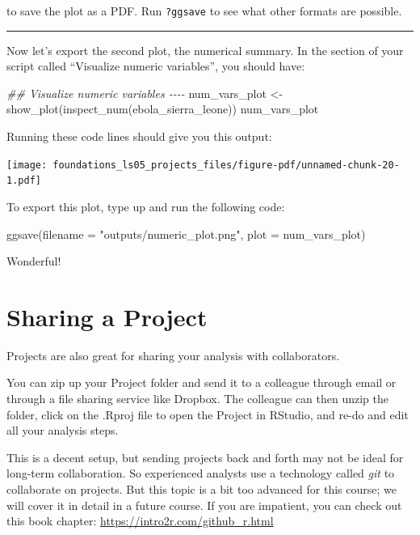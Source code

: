 \documentclass[
  letterpaper,
  DIV=11,
  numbers=noendperiod]{scrreprt}
\newenvironment{Shaded}{\begin{snugshade}}{\end{snugshade}}
\newcommand{\AttributeTok}[1]{\textcolor[rgb]{0.40,0.45,0.13}{#1}}
\newcommand{\DocumentationTok}[1]{\textcolor[rgb]{0.37,0.37,0.37}{\textit{#1}}}
\newcommand{\FunctionTok}[1]{\textcolor[rgb]{0.28,0.35,0.67}{#1}}
\newcommand{\NormalTok}[1]{\textcolor[rgb]{0.00,0.23,0.31}{#1}}
\newcommand{\OtherTok}[1]{\textcolor[rgb]{0.00,0.23,0.31}{#1}}
\newcommand{\StringTok}[1]{\textcolor[rgb]{0.13,0.47,0.30}{#1}}
\begin{document}
to save the plot as a PDF. Run \texttt{?ggsave} to see what other
formats are possible.

\begin{center}\rule{0.5\linewidth}{0.5pt}\end{center}

Now let's export the second plot, the numerical summary. In the section
of your script called ``Visualize numeric variables'', you should have:

\begin{Shaded}
\begin{Highlighting}[]
\DocumentationTok{\#\# Visualize numeric variables {-}{-}{-}{-}}
\NormalTok{num\_vars\_plot }\OtherTok{\textless{}{-}} \FunctionTok{show\_plot}\NormalTok{(}\FunctionTok{inspect\_num}\NormalTok{(ebola\_sierra\_leone))}
\NormalTok{num\_vars\_plot}
\end{Highlighting}
\end{Shaded}

Running these code lines should give you this output:

\texttt{[image: foundations\_ls05\_projects\_files/figure-pdf/unnamed-chunk-20-1.pdf]}

To export this plot, type up and run the following code:

\begin{Shaded}
\begin{Highlighting}[]
\FunctionTok{ggsave}\NormalTok{(}\AttributeTok{filename =} \StringTok{"outputs/numeric\_plot.png"}\NormalTok{, }\AttributeTok{plot =}\NormalTok{ num\_vars\_plot)}
\end{Highlighting}
\end{Shaded}

Wonderful!

\hypertarget{sharing-a-project}{%
\section{Sharing a Project}\label{sharing-a-project}}

Projects are also great for sharing your analysis with collaborators.

You can zip up your Project folder and send it to a colleague through
email or through a file sharing service like Dropbox. The colleague can
then unzip the folder, click on the .Rproj file to open the Project in
RStudio, and re-do and edit all your analysis steps.

This is a decent setup, but sending projects back and forth may not be
ideal for long-term collaboration. So experienced analysts use a
technology called \emph{git} to collaborate on projects. But this topic
is a bit too advanced for this course; we will cover it in detail in a
future course. If you are impatient, you can check out this book
chapter: \url{https://intro2r.com/github_r.html}
\end{document}
